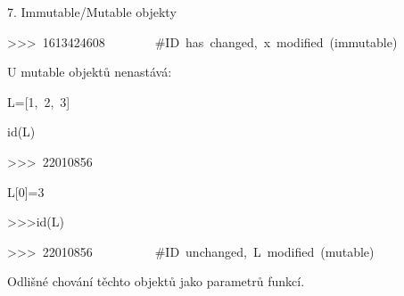 \documentclass[czech]{beamer}
\newenvironment{lyxcode}
  {\par\begin{list}{}{
    \setlength{\rightmargin}{\leftmargin}
    \setlength{\listparindent}{0pt}%
    \raggedright
    \setlength{\itemsep}{0pt}
    \setlength{\parsep}{0pt}
    \normalfont\ttfamily}%
   \def\{{\char`\{}
   \def\}{\char`\}}
   \def\textasciitilde{\char`\~}
   \item[]}
  {\end{list}}
\begin{document}
\begin{frame}[plain]{7. Immutable/Mutable objekty}
\begin{lyxcode}
{\scriptsize >\textcompwordmark >\textcompwordmark >~1613424608~~~~~~~~\#ID~has~changed,~x~modified~(immutable)}{\scriptsize\par}
\end{lyxcode}
{\scriptsize U mutable objektů nenastává:}{\scriptsize\par}
\begin{lyxcode}
{\scriptsize L={[}1,~2,~3{]}}{\scriptsize\par}

{\scriptsize id(L)~}{\scriptsize\par}

{\scriptsize >\textcompwordmark >\textcompwordmark >~22010856}{\scriptsize\par}

{\scriptsize L{[}0{]}=3~~}{\scriptsize\par}

{\scriptsize >\textcompwordmark >\textcompwordmark >id(L)~}{\scriptsize\par}

{\scriptsize >\textcompwordmark >\textcompwordmark >~22010856~~~~~~~~~~\#ID~unchanged,~L~modified~(mutable)}{\scriptsize\par}
\end{lyxcode}
{\scriptsize Odlišné chování těchto objektů jako parametrů funkcí.}{\scriptsize\par}
\end{frame}
\end{document}
